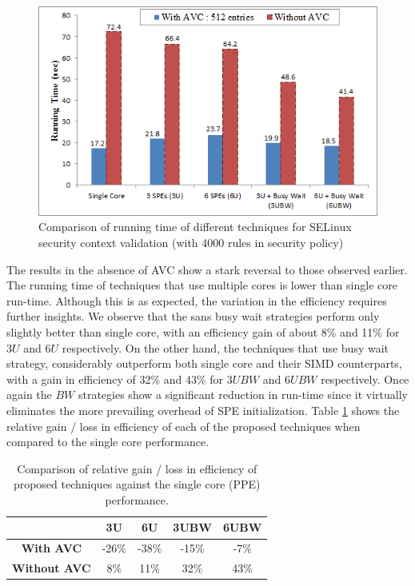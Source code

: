 \documentclass[conference]{IEEEtran}
\begin{document}
\begin{figure}
\centerline{\includegraphics[scale=0.58]{images/techs.png}}
\caption{Comparison of running time of different techniques for SELinux security context validation (with 4000 rules in security policy)}
\label{figGraphTech}
\vspace{-0.05cm}
\end{figure}

The results in the absence of AVC show a stark reversal to those observed earlier. The running time of techniques that use multiple cores is lower than single core run-time.
Although this is as expected, the variation in the efficiency requires
further insights. We observe that the sans busy wait strategies
perform only slightly better than single core, with an efficiency gain of about 8\% and 11\% for $3U$ and $6U$ respectively. On the
other hand, the techniques that use busy wait strategy, considerably
outperform both single core and their SIMD counterparts, with a gain in efficiency of 32\% and 43\% for $3UBW$ and $6UBW$
respectively. Once again the $BW$ strategies show a significant
reduction in run-time since it virtually eliminates the more
prevailing overhead of SPE initialization. Table \ref{tab1} shows the
relative gain / loss in efficiency of each of the proposed techniques when
compared to the single core performance.

\begin{table}[ht]
\centering
\caption{Comparison of relative gain / loss in efficiency of proposed techniques against the single core (PPE) performance.}
\begin{tabular}{|c|c|c|c|c|} \hline
 &\textbf{3U}&\textbf{6U}&\textbf{3UBW}&\textbf{6UBW}\\ \hline
\textbf{With AVC}& -26\%& -38\%& -15\% & -7\%\\ \hline
\textbf{Without AVC}& 8\%& 11\%& 32\% & 43\%\\ \hline
\hline\end{tabular}
\label{tab1}
\end{table}
\end{document}
